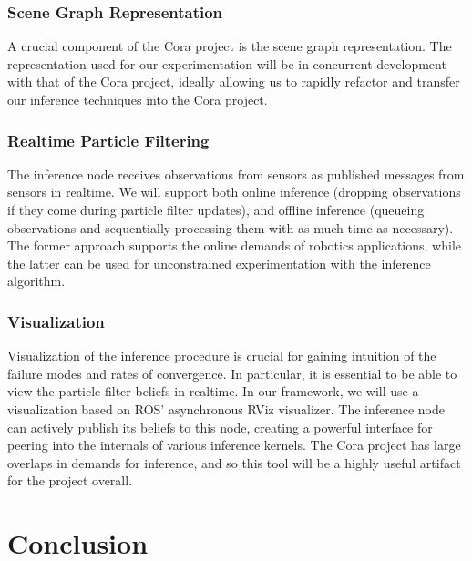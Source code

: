     \subsubsection{Scene Graph Representation}
     
      A crucial component of the Cora project is the scene graph
      representation. The representation used for our experimentation will be
      in concurrent development with that of the Cora project, ideally allowing
      us to rapidly refactor and transfer our inference techniques into the
      Cora project.

    \subsubsection{Realtime Particle Filtering}
      
      The inference node receives observations from sensors as published
      messages from sensors in realtime. We will support both online inference
      (dropping observations if they come during particle filter updates), and
      offline inference (queueing observations and sequentially processing them
      with as much time as necessary). The former approach supports the online
      demands of robotics applications, while the latter can be used for
      unconstrained experimentation with the inference algorithm.

    \subsubsection{Visualization}

      Visualization of the inference procedure is crucial for gaining intuition
      of the failure modes and rates of convergence. In particular, it is
      essential to be able to view the particle filter beliefs in realtime. In
      our framework, we will use a visualization based on ROS' asynchronous
      RViz visualizer. The inference node can actively publish its beliefs to
      this node, creating a powerful interface for peering into the internals
      of various inference kernels. The Cora project has large overlaps in
      demands for inference, and so this tool will be a highly useful artifact
      for the project overall.

\section{Conclusion}

